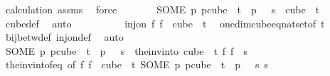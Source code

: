 \begin{isabellebody}
\ calculation\ assms\ \isamarkupfalse%
\ force\isanewline
\ \ \ \ \isamarkupfalse%
\ \isamarkupfalse%
\ {\isachardoublequoteopen}{\isacharparenleft}{\kern0pt}SOME\ p{\isachardot}{\kern0pt}\ p{\isasymin}cube\ {}\ {\isacharparenleft}{\kern0pt}t{\isacharplus}{\kern0pt}{}{\isacharparenright}{\kern0pt}\ {\isasymand}\ p\ {}\ {\isacharequal}{\kern0pt}\ s{\isacharparenright}{\kern0pt}\ {\isasymin}\ cube\ {}\ t{\isachardoublequoteclose}\ \isamarkupfalse%
\ {\isacharasterisk}{\kern0pt}\ \isamarkupfalse%
\ cube{\isacharunderscore}{\kern0pt}def\ \isamarkupfalse%
\ auto\ \ \isanewline
\ \ \isacommand{{\isacharbraceright}{\kern0pt}}\isamarkupfalse%
\isanewline
\ \ \isamarkupfalse%
\ \isamarkupfalse%
\ {\isachardoublequoteopen}inj{\isacharunderscore}{\kern0pt}on\ {\isacharparenleft}{\kern0pt}{\isasymlambda}f{\isachardot}{\kern0pt}\ f\ {}{\isacharparenright}{\kern0pt}\ {\isacharparenleft}{\kern0pt}cube\ {}\ t{\isacharparenright}{\kern0pt}{\isachardoublequoteclose}\ \isamarkupfalse%
\ one{\isacharunderscore}{\kern0pt}dim{\isacharunderscore}{\kern0pt}cube{\isacharunderscore}{\kern0pt}eq{\isacharunderscore}{\kern0pt}nat{\isacharunderscore}{\kern0pt}set{\isacharbrackleft}{\kern0pt}of\ t{\isacharbrackright}{\kern0pt}\ \isamarkupfalse%
\ bij{\isacharunderscore}{\kern0pt}betw{\isacharunderscore}{\kern0pt}def\ inj{\isacharunderscore}{\kern0pt}on{\isacharunderscore}{\kern0pt}def\ \isamarkupfalse%
\ auto\ \isanewline
\ \ \isamarkupfalse%
\ \isamarkupfalse%
\ {\isachardoublequoteopen}{\isacharparenleft}{\kern0pt}SOME\ p{\isachardot}{\kern0pt}\ p{\isasymin}cube\ {}\ {\isacharparenleft}{\kern0pt}t{\isacharplus}{\kern0pt}{}{\isacharparenright}{\kern0pt}\ {\isasymand}\ p\ {}\ {\isacharequal}{\kern0pt}\ s{\isacharparenright}{\kern0pt}\ {\isacharequal}{\kern0pt}\ {\isacharparenleft}{\kern0pt}the{\isacharunderscore}{\kern0pt}inv{\isacharunderscore}{\kern0pt}into\ {\isacharparenleft}{\kern0pt}cube\ {}\ t{\isacharparenright}{\kern0pt}\ {\isacharparenleft}{\kern0pt}{\isasymlambda}f{\isachardot}{\kern0pt}\ f\ {}{\isacharparenright}{\kern0pt}\ s{\isacharparenright}{\kern0pt}{\isachardoublequoteclose}\ \isamarkupfalse%
\ the{\isacharunderscore}{\kern0pt}inv{\isacharunderscore}{\kern0pt}into{\isacharunderscore}{\kern0pt}f{\isacharunderscore}{\kern0pt}eq\ {\isacharbrackleft}{\kern0pt}of\ {\isachardoublequoteopen}{\isasymlambda}f{\isachardot}{\kern0pt}\ f\ {}{\isachardoublequoteclose}\ {\isachardoublequoteopen}cube\ {}\ t{\isachardoublequoteclose}\ {\isachardoublequoteopen}{\isacharparenleft}{\kern0pt}SOME\ p{\isachardot}{\kern0pt}\ p{\isasymin}cube\ {}\ {\isacharparenleft}{\kern0pt}t{\isacharplus}{\kern0pt}{}{\isacharparenright}{\kern0pt}\ {\isasymand}\ p\ {}\ {\isacharequal}{\kern0pt}\ s{\isacharparenright}{\kern0pt}{\isachardoublequoteclose}\ s{\isacharbrackright}{\kern0pt}\ \isamarkupfalse%

\end{isabellebody}
